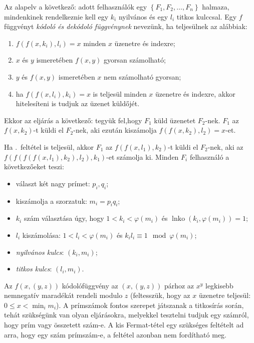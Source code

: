\documentclass[%
	DIV=15,appendixprefix]{scrreprt}
\theoremstyle{definition}
\theoremstyle{remark}
\DeclareMathOperator{\lnko}{lnko}
\begin{document}
Az alapelv a következő: adott felhasználók egy $ \left\{ F_{ 1 },{} F_{ 2 },{} \ldots,{} F_{ n }
\right\} $ halmaza, mindenkinek rendelkeznie kell egy $ k_{ i } $ nyilvános és egy $ l_{ i } $
titkos kulccsal. Egy $ f $ függvényt \emph{kódoló és dekódoló függvénynek} nevezünk, ha teljesülnek
az alábbiak:
	\begin{enumerate}
		\item $ f \left( f \left( x,{} k_{ i } \right), {} l_{ i } \right) = x $ minden $ x $
			üzenetre és indexre;
		\item $ x $ és $ y $ ismeretében $ f \left( x,{} y \right) $ gyorsan számolható;
		\item $ y $ és $ f \left( x,{} y \right) $ ismeretében $ x $ nem számolható gyorsan;
		\item\label{itm:felt} ha $ f \left( f \left( x,{} l_{ i } \right), {} k_{ i } \right) = x $
			is teljesül minden $x$ üzenetre és indexre, akkor hitelesíteni is tudjuk az üzenet
			küldőjét.
	\end{enumerate}
Ekkor az eljárás a következő: tegyük fel,hogy $ F_{ 1 } $ küld üzenetet $ F_{ 2 }$-nek. $ F_{ 1 } $
az $ f \left( x,{} k_{ 2 } \right) $-t küldi el $F_{ 2 } $-nek, aki ezután kiszámolja $ f \left( f
\left( x,{} k_{ 2 } \right), {} l_{ 2 } \right)=x $-et.

Ha .~feltétel is teljesül, akkor $ F_{ 1 } $ az $ f \left( f \left( x,{} l_{ 1 }
\right), {} k_{ 2 } \right) $-t küldi el $F_{ 2 } $-nek, aki az $ f \left( f \left( f \left( f
\left( x,{} l_{ 1 } \right), {} k_{ 2 } \right),{} l_{ 2 } \right),{} k_{ 1 } \right) $-et számolja
ki.
%
Minden $ F_{ i } $ felhasználó a következőeket teszi:
\begin{itemize}
	\item választ két nagy prímet: $ p_{ i },{} q_{ i }$;
	\item kiszámolja a szorzatuk: $ m_{ i } =  p_{ i } q_{ i } $;
	\item $ k_{ i } $ szám választása úgy, hogy $ 1 < k_{ i } < \varphi \left( m_{ i } \right) $ és
		$\lnko \left( k_{ i },{} \varphi \left( m_{ i } \right) \right) = 1 $;
	\item $ l_{ i } $ kiszámolása: $ 1 < l_{ i } < \varphi \left( m_{ i } \right) $ és $ k_{ i }
		l_{ i } \equiv 1 \mod{ \varphi \left( m_{ i } \right) }$;
	\item \emph{nyilvános kulcs}: $ \left( k_{ i },{} m_{ i } \right) $;
	\item \emph{titkos kulcs}: $ \left( l_{ i },{} m_{ i } \right) $.
\end{itemize}
Az $ f \left( x,{} \left( y,{} z \right) \right) $ kódolófüggvény az $ \left( x,{} \left( y,{} z
\right) \right) $ párhoz az $ x^{ y } $ legkisebb nemnegatív maradékát rendeli modulo $ z $
(feltesszük, hogy az $ x $ üzenetre teljesül: $ 0 \le x < \min_{ i } m_{ i } $).
%
A prímszámok fontos szerepet játszanak a titkosírás során, tehát szükségünk van olyan eljárásokra,
melyekkel tesztelni tudjuk egy számról, hogy prím vagy összetett szám-e. A kis Fermat-tétel egy
szükséges feltételt ad arra, hogy egy szám prímszám-e, a feltétel azonban nem fordítható meg.
\end{document}

